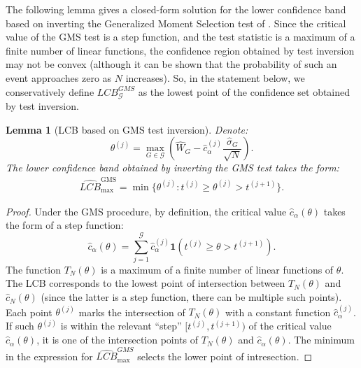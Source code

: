 \documentclass[12pt]{article}
\numberwithin{equation}{section}
\theoremstyle{plain}                         %
\newtheorem{lemma}{Lemma}
\theoremstyle{definition}                  %
\theoremstyle{remark}                      %
\begin{document}
The following lemma gives a closed-form solution for the lower confidence band based on inverting the Generalized Moment Selection test of \citet{andrews2010inference}.  Since the critical value of the GMS test is a step function, and the test statistic is a maximum of a finite number of linear functions, the confidence region obtained by test inversion may not be convex (although it can be shown that the probability of such an event approaches zero as $N$ increases). So, in the statement below, we conservatively define ${LCB}_{\mathcal{G}}^{GMS}$ as the lowest point of the confidence set obtained by test inversion. 


\begin{lemma}[LCB based on GMS test inversion]
Denote: 
 \[
 \theta^{(j)} = \max \limits_{G \in \mathcal{G}}\left(\widehat{W}_G - \widehat{c}^{(j)}_{\alpha} \frac{\widehat{\sigma}_G}{\sqrt{N}} \right).
 \]
The lower confidence band obtained by inverting the GMS test takes the form:
\begin{align}
\label{eq:gms}
\widehat{LCB}_{\max}^{\text{GMS}} = \min\{\theta^{(j)}: t^{(j)} \geqslant \theta^{(j)} > t^{(j+1)}\}.
\end{align}
\end{lemma}
\begin{proof}
Under the GMS procedure, by definition, the critical value $\widehat{c}_{\alpha}(\theta)$ takes the form of a step function:
\[
\widehat{c}_{\alpha}(\theta) =  \sum_{j = 1}^{\mathcal{G}} \widehat{c}_{\alpha}^{(j)} \bm{1}(t^{(j)} \geqslant \theta > t^{(j+1)}).
\]
The function $T_N(\theta)$ is a maximum of a finite number of linear functions of $\theta$. The LCB corresponds to the lowest point of intersection between $T_N(\theta)$ and $\widehat{c}_N(\theta)$ (since the latter is a step function, there can be multiple such points). Each point $\theta^{(j)}$ marks the intersection of $T_N(\theta)$ with a constant function $\widehat{c}^{(j)}_{\alpha}$. If such $\theta^{(j)}$ is within the relevant ``step'' $[t^{(j)}, t^{(j+1)})$ of the critical value $\widehat{c}_{\alpha}(\theta)$, it is one of the intersection points of $T_N(\theta)$ and $\widehat{c}_{\alpha}(\theta)$. The minimum in the expression for $\widehat{LCB}_{\max}^{GMS}$ selects the lower point of intresection. 
\end{proof}
\end{document}

